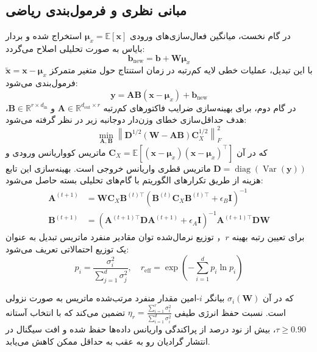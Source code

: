\subsection{مبانی نظری و فرمول‌بندی ریاضی}
در گام نخست، میانگین فعال‌سازی‌های ورودی $\boldsymbol{\mu}_x = \mathbb{E}[\mathbf{x}]$ استخراج شده و بردار بایاس به صورت تحلیلی اصلاح می‌گردد:
\begin{equation}
\mathbf{b}_{\text{new}} = \mathbf{b} + \mathbf{W} \boldsymbol{\mu}_x
\end{equation}
با این تبدیل، عملیات خطی لایه کم‌رتبه در زمان استنتاج حول متغیر متمرکز $\tilde{\mathbf{x}} = \mathbf{x} - \boldsymbol{\mu}_x$ فرمول‌بندی می‌شود:
\begin{equation}
\mathbf{y} = \mathbf{A}\mathbf{B} (\mathbf{x} - \boldsymbol{\mu}_x) + \mathbf{b}_{\text{new}}
\end{equation}
در گام دوم، برای بهینه‌سازی ضرایب فاکتورهای کم‌رتبه $\mathbf{A} \in \mathbb{R}^{d_{\text{out}} \times r}$ و $\mathbf{B} \in \mathbb{R}^{r \times d_{\text{in}}}$، هدف حداقل‌سازی خطای وزن‌دار دوجانبه زیر در نظر گرفته می‌شود:
\begin{equation}
\min_{\mathbf{A}, \mathbf{B}} \left\| \mathbf{D}^{1/2} (\mathbf{W} - \mathbf{A}\mathbf{B}) \mathbf{C}_X^{1/2} \right\|_F^2
\end{equation}
که در آن $\mathbf{C}_X = \mathbb{E}[(\mathbf{x} - \boldsymbol{\mu}_x)(\mathbf{x} - \boldsymbol{\mu}_x)^\top]$ ماتریس کوواریانس ورودی و $\mathbf{D} = \operatorname{diag}(\operatorname{Var}(\mathbf{y}))$ ماتریس قطری واریانس خروجی است. بهینه‌سازی این تابع هزینه از طریق تکرارهای الگوریتم  با گام‌های تحلیلی بسته حاصل می‌شود:
\begin{align}
\mathbf{A}^{(t+1)} &= \mathbf{W} \mathbf{C}_X \mathbf{B}^{(t)\top} \left( \mathbf{B}^{(t)} \mathbf{C}_X \mathbf{B}^{(t)\top} + \epsilon_B \mathbf{I} \right)^{-1} \\
\mathbf{B}^{(t+1)} &= \left( \mathbf{A}^{(t+1)\top} \mathbf{D} \mathbf{A}^{(t+1)} + \epsilon_A \mathbf{I} \right)^{-1} \mathbf{A}^{(t+1)\top} \mathbf{D} \mathbf{W}
\end{align}
برای تعیین رتبه بهینه $r$， توزیع نرمال‌شده توان مقادیر منفرد ماتریس تبدیل به عنوان یک توزیع احتمالاتی تعریف می‌شود:
\begin{equation}
p_i = \frac{\sigma_i^2}{\sum_{j=1}^d \sigma_j^2}, \quad r_{\text{eff}} = \exp\left( - \sum_{i=1}^d p_i \ln p_i \right)
\end{equation}

که در آن $\sigma_i(\mathbf{W})$ بیانگر $i$-امین مقدار منفرد مرتب‌شده ماتریس به صورت نزولی است. نسبت حفظ انرژی طیفی $\eta_r = \frac{\sum_{i=1}^r \sigma_i^2}{\sum_{i=1}^{d} \sigma_i^2}$ تضمین می‌کند که با انتخاب آستانه $\tau \ge 0.90$، بیش از نود درصد از پراکندگی واریانس داده‌ها حفظ شده و افت سیگنال در انتشار گرادیان رو به عقب به حداقل ممکن کاهش می‌یابد.

